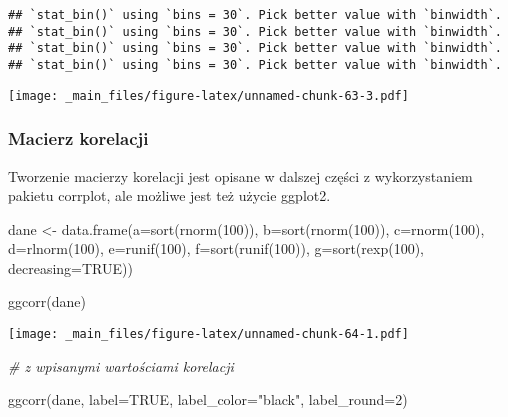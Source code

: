 \documentclass[
]{book}
\newenvironment{Shaded}{\begin{snugshade}}{\end{snugshade}}
\newcommand{\AttributeTok}[1]{\textcolor[rgb]{0.77,0.63,0.00}{#1}}
\newcommand{\CommentTok}[1]{\textcolor[rgb]{0.56,0.35,0.01}{\textit{#1}}}
\newcommand{\ConstantTok}[1]{\textcolor[rgb]{0.00,0.00,0.00}{#1}}
\newcommand{\DecValTok}[1]{\textcolor[rgb]{0.00,0.00,0.81}{#1}}
\newcommand{\FunctionTok}[1]{\textcolor[rgb]{0.00,0.00,0.00}{#1}}
\newcommand{\NormalTok}[1]{#1}
\newcommand{\OtherTok}[1]{\textcolor[rgb]{0.56,0.35,0.01}{#1}}
\newcommand{\StringTok}[1]{\textcolor[rgb]{0.31,0.60,0.02}{#1}}
\begin{document}
\begin{verbatim}
## `stat_bin()` using `bins = 30`. Pick better value with `binwidth`.
## `stat_bin()` using `bins = 30`. Pick better value with `binwidth`.
## `stat_bin()` using `bins = 30`. Pick better value with `binwidth`.
## `stat_bin()` using `bins = 30`. Pick better value with `binwidth`.
\end{verbatim}

\texttt{[image: \_main\_files/figure-latex/unnamed-chunk-63-3.pdf]}

\hypertarget{macierz-korelacji}{%
\subsubsection{Macierz korelacji}\label{macierz-korelacji}}

Tworzenie macierzy korelacji jest opisane w dalszej części z wykorzystaniem pakietu corrplot, ale możliwe jest też użycie ggplot2.

\begin{Shaded}
\begin{Highlighting}[]
\NormalTok{dane }\OtherTok{\textless{}{-}} \FunctionTok{data.frame}\NormalTok{(}\AttributeTok{a=}\FunctionTok{sort}\NormalTok{(}\FunctionTok{rnorm}\NormalTok{(}\DecValTok{100}\NormalTok{)), }\AttributeTok{b=}\FunctionTok{sort}\NormalTok{(}\FunctionTok{rnorm}\NormalTok{(}\DecValTok{100}\NormalTok{)), }\AttributeTok{c=}\FunctionTok{rnorm}\NormalTok{(}\DecValTok{100}\NormalTok{), }\AttributeTok{d=}\FunctionTok{rlnorm}\NormalTok{(}\DecValTok{100}\NormalTok{), }\AttributeTok{e=}\FunctionTok{runif}\NormalTok{(}\DecValTok{100}\NormalTok{),}
                   \AttributeTok{f=}\FunctionTok{sort}\NormalTok{(}\FunctionTok{runif}\NormalTok{(}\DecValTok{100}\NormalTok{)), }\AttributeTok{g=}\FunctionTok{sort}\NormalTok{(}\FunctionTok{rexp}\NormalTok{(}\DecValTok{100}\NormalTok{), }\AttributeTok{decreasing=}\ConstantTok{TRUE}\NormalTok{))}

\FunctionTok{ggcorr}\NormalTok{(dane)}
\end{Highlighting}
\end{Shaded}

\texttt{[image: \_main\_files/figure-latex/unnamed-chunk-64-1.pdf]}

\begin{Shaded}
\begin{Highlighting}[]
\CommentTok{\# z wpisanymi wartościami korelacji}

\FunctionTok{ggcorr}\NormalTok{(dane, }\AttributeTok{label=}\ConstantTok{TRUE}\NormalTok{, }\AttributeTok{label\_color=}\StringTok{"black"}\NormalTok{, }\AttributeTok{label\_round=}\DecValTok{2}\NormalTok{)}
\end{Highlighting}
\end{Shaded}
\end{document}
